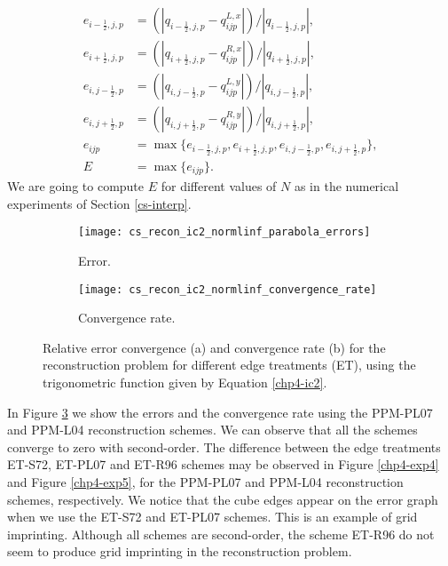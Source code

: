 \begin{align*}
	e_{{i-\frac{1}{2}},j,p} &= (|q_{{i-\frac{1}{2}},j,p} - q^{L,x}_{ijp}|)/|q_{{i-\frac{1}{2}},j,p}|,\\
	e_{{i+\frac{1}{2}},j,p} &= (|q_{{i+\frac{1}{2}},j,p} - q^{R,x}_{ijp}|)/|q_{{i+\frac{1}{2}},j,p}|,\\
	e_{i,{j-\frac{1}{2}},p} &= (|q_{i,{j-\frac{1}{2}},p} - q^{L,y}_{ijp}|)/|q_{i,{j-\frac{1}{2}},p}|,\\
	e_{i,{j+\frac{1}{2}},p} &= (|q_{i,{j+\frac{1}{2}},p} - q^{R,y}_{ijp}|)/|q_{i,{j+\frac{1}{2}},p}|,\\
	e_{ijp} &= \max\{e_{{i-\frac{1}{2}},j,p}, e_{{i+\frac{1}{2}},j,p} , e_{i,{j-\frac{1}{2}},p}, e_{i,{j+\frac{1}{2}},p} \},\\
	E &= \max \{e_{ijp}\}.
\end{align*}
We are going to compute $E$ for different values of $N$ as in the numerical experiments of Section \ref{cs-interp}.
\begin{figure}[!htb]
	\centering
	\begin{subfigure}{0.45\textwidth}
		\centering
		\texttt{[image: cs\_recon\_ic2\_normlinf\_parabola\_errors]}
		\caption{Error.\label{chp4-exp3-error}}
	\end{subfigure}
	\begin{subfigure}{0.45\textwidth}
		\centering
		\texttt{[image: cs\_recon\_ic2\_normlinf\_convergence\_rate]}
		\caption{Convergence rate.\label{chp4-exp3-CR}}
	\end{subfigure}
	\caption{Relative error convergence (a) and convergence rate (b) for the reconstruction problem for different
	edge treatments (ET), using the trigonometric function given by Equation \eqref{chp4-ic2}.\label{chp4-exp3}}
\end{figure}

In Figure \ref{chp4-exp3} we show the errors and the convergence rate using the PPM-PL07 and PPM-L04 reconstruction schemes.
We can observe that all the schemes converge to zero with second-order.
The difference between the edge treatments ET-S72, ET-PL07 and ET-R96 schemes
may be observed in Figure \ref{chp4-exp4} and Figure \ref{chp4-exp5}, for the  PPM-PL07 and PPM-L04 reconstruction schemes, respectively.
We notice that the cube edges appear on the error graph when we use the ET-S72 and ET-PL07 schemes. This is an example of grid imprinting.
Although all schemes are second-order, the scheme ET-R96 do not seem to produce grid imprinting in the reconstruction problem.

